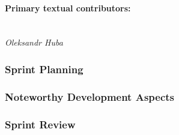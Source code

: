 \paragraph{Primary textual contributors:}
\mbox{}\\\emph{Oleksandr Huba}

\subsubsection{Sprint Planning}


\subsubsection{Noteworthy Development Aspects}


\subsubsection{Sprint Review}

